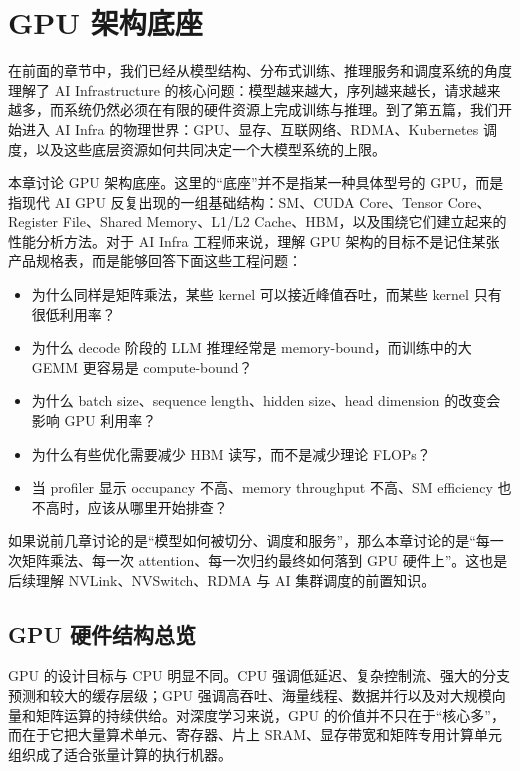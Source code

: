 \chapter{GPU 架构底座}
\label{chap:gpu-architecture}

在前面的章节中，我们已经从模型结构、分布式训练、推理服务和调度系统的角度理解了 AI Infrastructure 的核心问题：模型越来越大，序列越来越长，请求越来越多，而系统仍然必须在有限的硬件资源上完成训练与推理。到了第五篇，我们开始进入 AI Infra 的物理世界：GPU、显存、互联网络、RDMA、Kubernetes 调度，以及这些底层资源如何共同决定一个大模型系统的上限。

本章讨论 GPU 架构底座。这里的“底座”并不是指某一种具体型号的 GPU，而是指现代 AI GPU 反复出现的一组基础结构：SM、CUDA Core、Tensor Core、Register File、Shared Memory、L1/L2 Cache、HBM，以及围绕它们建立起来的性能分析方法。对于 AI Infra 工程师来说，理解 GPU 架构的目标不是记住某张产品规格表，而是能够回答下面这些工程问题：

\begin{itemize}
  \item 为什么同样是矩阵乘法，某些 kernel 可以接近峰值吞吐，而某些 kernel 只有很低利用率？
  \item 为什么 decode 阶段的 LLM 推理经常是 memory-bound，而训练中的大 GEMM 更容易是 compute-bound？
  \item 为什么 batch size、sequence length、hidden size、head dimension 的改变会影响 GPU 利用率？
  \item 为什么有些优化需要减少 HBM 读写，而不是减少理论 FLOPs？
  \item 当 profiler 显示 occupancy 不高、memory throughput 不高、SM efficiency 也不高时，应该从哪里开始排查？
\end{itemize}

如果说前几章讨论的是“模型如何被切分、调度和服务”，那么本章讨论的是“每一次矩阵乘法、每一次 attention、每一次归约最终如何落到 GPU 硬件上”。这也是后续理解 NVLink、NVSwitch、RDMA 与 AI 集群调度的前置知识。

\section{GPU 硬件结构总览}
\label{sec:gpu-hardware-overview}

GPU 的设计目标与 CPU 明显不同。CPU 强调低延迟、复杂控制流、强大的分支预测和较大的缓存层级；GPU 强调高吞吐、海量线程、数据并行以及对大规模向量和矩阵运算的持续供给。对深度学习来说，GPU 的价值并不只在于“核心多”，而在于它把大量算术单元、寄存器、片上 SRAM、显存带宽和矩阵专用计算单元组织成了适合张量计算的执行机器。

